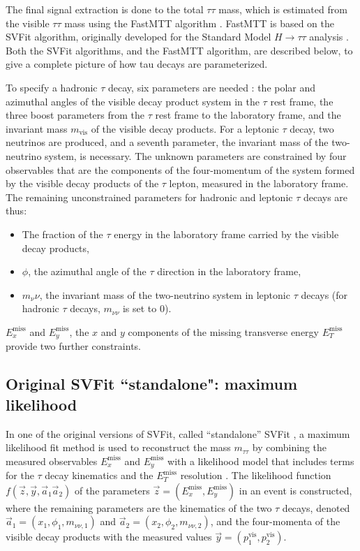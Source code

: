The final signal extraction is done to the total $\tau\tau$ mass, which is estimated from the visible $\tau\tau$ mass using the FastMTT algorithm \cite{2014_SVFit_Bianchini}. FastMTT is based on the SVFit algorithm, originally developed for the Standard Model $H \rightarrow \tau\tau$ analysis \cite{CMS-HIG-13-004}. Both the SVFit algorithms, and the FastMTT algorithm, are described below, to give a complete picture of how tau decays are parameterized.

To specify a hadronic $\tau$ decay, six parameters are needed \cite{CMS-HIG-13-004}: the polar and azimuthal angles of the visible decay product system in the $\tau$ rest frame, the three boost parameters from the $\tau$ rest frame to the laboratory frame, and the invariant mass $m_{\text{vis}}$ of the visible decay products. For a leptonic $\tau$ decay, two neutrinos are produced, and a seventh parameter, the invariant mass of the two-neutrino system, is necessary. The unknown parameters are constrained by four observables that are the components of the four-momentum of the system formed by the visible decay products of the $\tau$ lepton, measured in the laboratory frame. The remaining unconstrained parameters for hadronic and leptonic $\tau$ decays are thus:

\begin{itemize}
    \item The fraction of the $\tau$ energy in the laboratory frame carried by the visible decay products,
    \item $\phi$, the azimuthal angle of the $\tau$ direction in the laboratory frame,
    \item $m_\nu\nu$, the invariant mass of the two-neutrino system in leptonic $\tau$ decays (for hadronic $\tau$ decays, $m_{\nu\nu}$ is set to 0).
\end{itemize}
$E_{x}^{\text{miss}}$ and $E_{y}^{\text{miss}}$, the $x$ and $y$ components of the missing transverse energy $E_{T}^{\text{miss}}$ provide two further constraints. 

\subsection{Original SVFit \texorpdfstring{``standalone"}{"standalone"}: maximum likelihood}
In one of the original versions of SVFit, called ``standalone'' SVFit \cite{CMS-HIG-13-004}, a maximum likelihood fit method is used to reconstruct the mass $m_{\tau\tau}$ by combining the measured observables $E_{x}^{\text{miss}}$ and $E_{y}^{\text{miss}}$ with a likelihood model that includes terms for the $\tau$ decay kinematics and the $E_{T}^{\text{miss}}$ resolution \cite{CMS-HIG-13-004}. The likelihood function $f(\vec{z}, \vec{y}, \vec{a}_1 \vec{a}_2)$ of the parameters $\vec{z} = (E_{x}^{\text{miss}}, E_{y}^{\text{miss}})$ in an event is constructed, where the remaining parameters are the kinematics of the two $\tau$ decays, denoted $\vec{a}_1 = (x_1, \phi_1, m_{\nu\nu, 1})$ and $\vec{a}_2 = (x_2, \phi_2, m_{\nu\nu, 2})$, and the four-momenta of the visible decay products with the measured values $\vec{y} = (p_1^{\text{vis}}, p_2^{\text{vis}})$.

